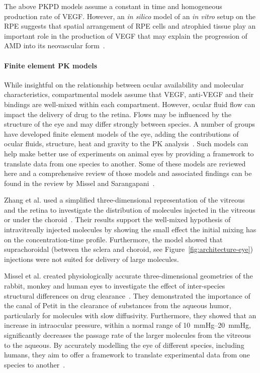 \documentclass{article}
\begin{document}
The above PKPD models assume a constant in time and homogeneous production rate of VEGF.
However, an \textit{in silico} model of an \textit{in vitro} setup on the RPE suggests that spatial arrangement of RPE cells and atrophied tissue play an important role in the production of VEGF that may explain the progression of AMD into its neovascular form~\cite{Baker_2017}.  

\paragraph*{Finite element PK models}

While insightful on the relationship between ocular availability and molecular characteristics, compartmental models assume that VEGF, anti-VEGF and their bindings are well-mixed within each compartment.
However, ocular fluid flow can impact the delivery of drug to the retina.
Flows may be influenced by the structure of the eye and may differ strongly between species.
A number of groups have developed finite element models of the eye, adding the contributions of ocular fluids, structure, heat and gravity to the PK analysis~\cite{Lamminsalo_2018, Missel_2012, Zhang_2018}.
Such models can help make better use of experiments on animal eyes by providing a framework to translate data from one species to another.
Some of these models are reviewed here and a comprehensive review of those models and associated findings can be found in the review by Missel and Sarangapani~\cite{Missel_2019}.

Zhang et al. used a simplified three-dimensional representation of the vitreous and the retina to investigate the distribution of molecules injected in the vitreous or under the choroid~\cite{Zhang_2018}.
Their results support the well-mixed hypothesis of intravitreally injected molecules by showing the small effect the initial mixing has on the concentration-time profile.
Furthermore, the model showed that suprachoroidal (between the sclera and choroid, see Figure~\ref{fig:architecture-eye}) injections were not suited for delivery of large molecules.

Missel et al. created physiologically accurate three-dimensional geometries of the rabbit, monkey and human eyes to investigate the effect of inter-species structural differences on drug clearance~\cite{Missel_2012}.  
They demonstrated the importance of the canal of Petit in the clearance of substances from the aqueous humor, particularly for molecules with slow diffusivity. 
Furthermore, they showed that an increase in intraocular pressure, within a normal range of \SIrange[range-units = single]{10}{20}{\mmHg}, significantly decreases the passage rate of the larger molecules from the vitreous to the aqueous.
By accurately modelling the eye of different species, including humans, they aim to offer a framework to translate experimental data from one species to another~\cite{Missel_2012}.
\end{document}

